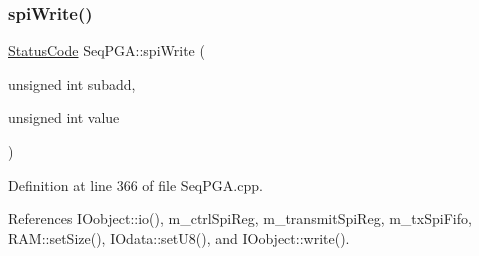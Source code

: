 \subsubsection{\texorpdfstring{spi\+Write()}{spiWrite()}\hspace{0.1cm}{\footnotesize\ttfamily [3/3]}}
{\footnotesize\ttfamily \hyperlink{classStatusCode}{Status\+Code} Seq\+P\+G\+A\+::spi\+Write (\begin{DoxyParamCaption}\item[{unsigned int}]{subadd,  }\item[{unsigned int}]{value }\end{DoxyParamCaption})}



Definition at line 366 of file Seq\+P\+G\+A.\+cpp.



References I\+Oobject\+::io(), m\+\_\+ctrl\+Spi\+Reg, m\+\_\+transmit\+Spi\+Reg, m\+\_\+tx\+Spi\+Fifo, R\+A\+M\+::set\+Size(), I\+Odata\+::set\+U8(), and I\+Oobject\+::write().


